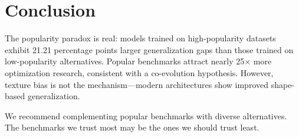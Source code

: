 \section{Conclusion}

The popularity paradox is real: models trained on high-popularity datasets exhibit 21.21 percentage points larger generalization gaps than those trained on low-popularity alternatives. Popular benchmarks attract nearly 25$\times$ more optimization research, consistent with a co-evolution hypothesis. However, texture bias is not the mechanism---modern architectures show improved shape-based generalization.

We recommend complementing popular benchmarks with diverse alternatives. The benchmarks we trust most may be the ones we should trust least.
